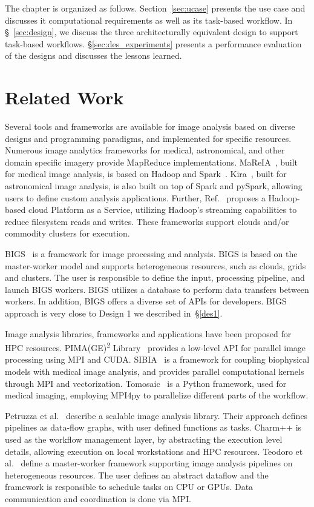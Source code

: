 The chapter is organized as follows.
Section~\ref{sec:ucase} presents the use case and discusses it computational requirements as well as its task-based workflow.
In \S~\ref{sec:design}, we discuss the three architecturally equivalent design to support task-based workflows.
 \S\ref{sec:des_experiments} presents a performance evaluation of the designs and discusses the lessons learned.
 
 \section{Related Work}
Several tools and frameworks are available for image analysis based on diverse designs and programming paradigms, and implemented for specific resources.
Numerous image analytics frameworks for medical, astronomical, and other domain specific imagery provide MapReduce implementations.
MaReIA~\cite{vo2018mareia}, built for medical image analysis, is based on Hadoop and Spark~\cite{zaharia2010spark}.
Kira~\cite{zhang2016kira}, built for astronomical image analysis, is also built on top of Spark and pySpark, allowing users to define custom analysis applications.
Further, Ref.~\cite{yan2014large} proposes a Hadoop-based cloud Platform as a Service, utilizing Hadoop's streaming capabilities to reduce filesystem reads and writes.
These frameworks support clouds and/or commodity clusters for execution.
 
BIGS~\cite{ramos2012bigs} is a framework for image processing and analysis.
BIGS is based on the master-worker model and supports heterogeneous resources, such as clouds, grids and clusters.
The user is responsible to define the input, processing pipeline, and launch BIGS workers.
BIGS utilizes a database to perform data transfers between workers.
In addition, BIGS offers a diverse set of APIs for developers.
BIGS approach is very close to Design 1 we described in~\S\ref{des1}.

Image analysis libraries, frameworks and applications have been proposed for HPC resources.
PIMA(GE)\textsuperscript{2} Library~\cite{galizia2015mpicuda} provides a low-level API for parallel image processing using MPI and CUDA.
SIBIA~\cite{gholami2017framework} is a framework for coupling biophysical models with medical image analysis, and provides parallel computational kernels through MPI and vectorization.
Tomosaic~\cite{vescovi2018tomosaic} is a Python framework, used for medical imaging, employing MPI4py to parallelize different parts of the workflow.
 
Petruzza et al.~\cite{petruzza2017isavs} describe a scalable image analysis library.
Their approach defines pipelines as data-flow graphs, with user defined functions as tasks.
Charm++ is used as the workflow management layer, by abstracting the execution level details, allowing execution on local workstations and HPC resources.
Teodoro et al.~\cite{teodoro2013highthroughput} define a master-worker framework supporting image analysis pipelines on heterogeneous resources.
The user defines an abstract dataflow and the framework is responsible to schedule tasks on CPU or GPUs.
Data communication and coordination is done via MPI.
 
